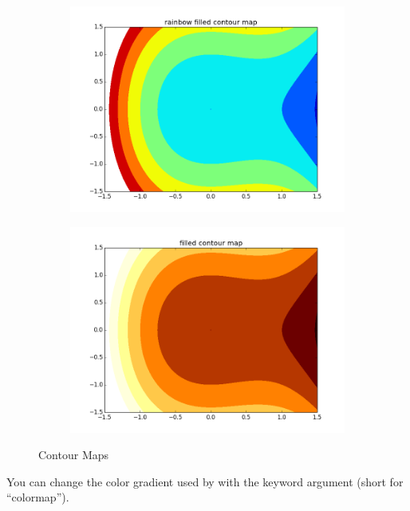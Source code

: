 \begin{figure}[h]
\centering
\begin{subfigure}{.45\textwidth}
  \centering
  \includegraphics[width=\textwidth]{contour_map_rainbow_filled.png}
\end{subfigure}
\begin{subfigure}{.45\textwidth}
  \centering
  \includegraphics[width=\textwidth]{contour_map_filled.png}
\end{subfigure}%
\caption{Contour Maps }
\label{fig:contourmap}
\end{figure}


You can change the color gradient used by  with the keyword argument  (short for ``colormap''). 

